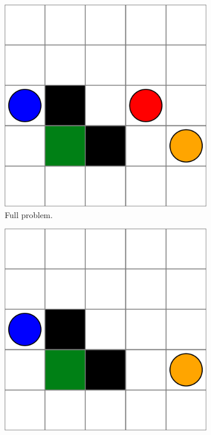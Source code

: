 \begin{figure}
    \centering
    \begin{subfigure}[b]{0.25\textwidth}
        \centering
        \includegraphics[width=\textwidth]{figures/problem_decomposition/g.pdf}
        \caption{Full problem.}
        \label{fig:ch6_fullg}
    \end{subfigure}
    \hfill
    \begin{subfigure}[b]{0.25\textwidth}
        \centering
        \includegraphics[width=\textwidth]{figures/problem_decomposition/g_sub1.pdf}

\end{subfigure}
\end{figure}
